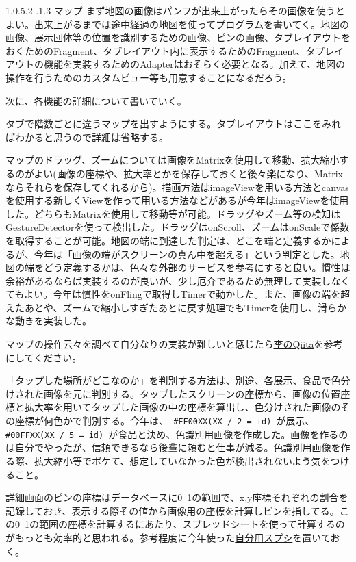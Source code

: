 \documentclass[dvipdfmx,jb5]{jarticle}
\makeatletter
\newcommand{\subsubsubsection}{\@startsection{paragraph}{4}{\z@}%
    {1.0\Cvs \@plus.5\Cdp \@minus.2\Cdp}%
    {.1\Cvs \@plus.3\Cdp}%
    {\large \bfseries}
  }
\newcommand{\link}[2]{\href{#2}{#1}}
\makeatother
\begin{document}
 \subsubsubsection{マップ}
 まず地図の画像はパンフが出来上がったらその画像を使うとよい。出来上がるまでは途中経過の地図を使ってプログラムを書いてく。地図の画像、展示団体等の位置を識別するための画像、ピンの画像、タブレイアウトをおくためのFragment、タブレイアウト内に表示するためのFragment、タブレイアウトの機能を実装するためのAdapterはおそらく必要となる。加えて、地図の操作を行うためのカスタムビュー等も用意することになるだろう。\par
 次に、各機能の詳細について書いていく。\par
 タブで階数ごとに違うマップを出すようにする。タブレイアウトはここをみればわかると思うので詳細は省略する。\par
マップのドラッグ、ズームについては画像をMatrixを使用して移動、拡大縮小するのがよい(画像の座標や、拡大率とかを保存しておくと後々楽になり、Matrixならそれらを保存してくれるから)。描画方法はimageViewを用いる方法とcanvasを使用する新しくViewを作って用いる方法などがあるが今年はimageViewを使用した。どちらもMatrixを使用して移動等が可能。ドラッグやズーム等の検知はGestureDetectorを使って検出した。ドラッグはonScroll、ズームはonScaleで係数を取得することが可能。地図の端に到達した判定は、どこを端と定義するかによるが、今年は「画像の端がスクリーンの真ん中を超える」という判定とした。地図の端をどう定義するかは、色々な外部のサービスを参考にすると良い。慣性は余裕があるならば実装するのが良いが、少し厄介であるため無理して実装しなくてもよい。今年は慣性をonFlingで取得しTimerで動かした。また、画像の端を超えたあとや、ズームで縮小しすぎたあとに戻す処理でもTimerを使用し、滑らかな動きを実装した。\par
マップの操作云々を調べて自分なりの実装が難しいと感じたら\link{李のQiita}{https://qiita.com/Cyber_Hacnosuke/items/b2a8724218d2f4a4c3c2}を参考にしてください。\par
「タップした場所がどこなのか」を判別する方法は、別途、各展示、食品で色分けされた画像を元に判別する。タップしたスクリーンの座標から、画像の位置座標と拡大率を用いてタップした画像の中の座標を算出し、色分けされた画像のその座標が何色かで判別する。今年は、\verb+ #FF00XX(XX / 2 = id) +が展示、\verb+ #00FFXX(XX / 5 = id) +が食品と決め、色識別用画像を作成した。画像を作るのは自分でやったが、信頼できるなら後輩に頼むと仕事が減る。色識別用画像を作る際、拡大縮小等でボケて、想定していなかった色が検出されないよう気をつけること。\par
詳細画面のピンの座標はデータベースに0~1の範囲で、x,y座標それぞれの割合を記録しておき、表示する際その値から画像用の座標を計算しピンを指してる。この0~1の範囲の座標を計算するにあたり、スプレッドシートを使って計算するのがもっとも効率的と思われる。参考程度に今年使った\link{自分用スプシ}{https://bit.ly/3cm73ig}を置いておく。\par
\end{document}
